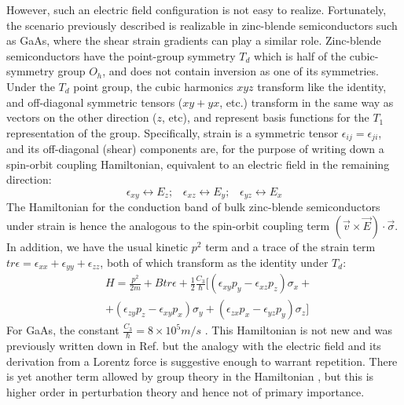 \documentclass[prl,aps,amssymb,shownopacs,twocolumn]{revtex4}
\begin{document}
However, such an electric field configuration is not easy to
realize. Fortunately, the scenario previously described is
realizable in zinc-blende semiconductors such as GaAs, where the
shear strain gradients can play a similar role. Zinc-blende
semiconductors have the point-group symmetry $T_d$ which is half
of the cubic-symmetry group $O_h$, and does not contain inversion
as one of its symmetries. Under the $T_d$ point group, the cubic
harmonics $xyz$ transform like the identity, and off-diagonal
symmetric tensors ($xy +yx$, etc.) transform in the same way as
vectors on the other direction ($z$, etc), and represent basis
functions for the $T_1$ representation of the group. Specifically,
strain is a symmetric tensor $\epsilon_{ij} = \epsilon_{ji}$, and
its off-diagonal (shear) components are, for the purpose of
writing down a spin-orbit coupling Hamiltonian, equivalent to an
electric field in the remaining direction:
\begin{equation} \label{strainelectricfieldanalogy}
\epsilon_{xy} \leftrightarrow E_z;\;\;\; \epsilon_{xz} \leftrightarrow
E_y;\;\;\;\epsilon_{yz} \leftrightarrow E_x
\end{equation}
\noindent The Hamiltonian for the conduction band of bulk
zinc-blende semiconductors under strain is hence the analogous to
the spin-orbit coupling term $(\vec{v} \times \vec{E})\cdot
\vec{\sigma}$. In addition, we have the usual kinetic $p^2$ term
and a trace of the strain term $tr{\epsilon} = \epsilon_{xx} +
\epsilon_{yy} +\epsilon_{zz}$, both of which transform as the
identity under $T_d$:
\begin{eqnarray}
& H = \frac{p^2}{2m} + B tr{\epsilon} +\frac{1}{2}
\frac{C_3}{\hbar}
[ (\epsilon_{xy} p_y - \epsilon_{xz} p_z) \sigma_x + \nonumber \\
& +(\epsilon_{zy} p_z - \epsilon_{xy} p_x) \sigma_y + (\epsilon_{zx}
p_x - \epsilon_{yz} p_y) \sigma_z ]
\end{eqnarray}
\noindent For GaAs, the constant $\frac{C_3}{\hbar} = 8 \times
10^5 m/s$ \cite{dyakonov1986}. This Hamiltonian is not new and was
previously written down in Ref.
\cite{pikus1984,howlett1977,khaetskii2001,bahder1990} but the
analogy with the electric field and its derivation from a Lorentz
force is suggestive enough to warrant repetition. There is yet
another term allowed by group theory in the Hamiltonian
\cite{bernevig2004}, but this is higher order in perturbation
theory and hence not of primary importance.
\end{document}
